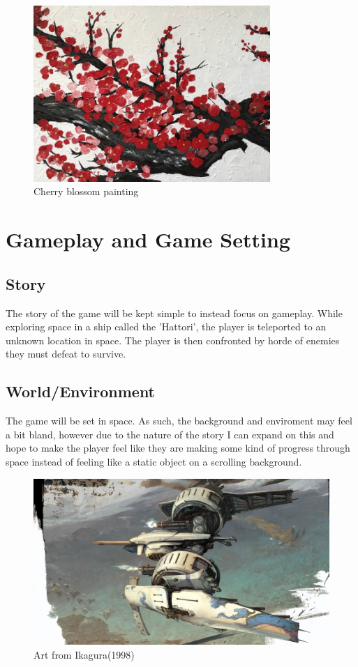 \documentclass[a4paper]{scrreprt}
\begin{document}
  \begin{figure}[h]
    \centering
    \includegraphics[width=0.8\textwidth]{cherry}
    \caption{Cherry blossom painting}
    \end{figure}
\chapter{Gameplay and Game Setting}
\section{Story}
The story of the game will be kept simple to instead focus on gameplay. While exploring space in a ship called the 'Hattori', the player is teleported to an unknown location in space. The player is then confronted by horde of enemies they must defeat to survive.

\section{World/Environment}
The game will be set in space. As such, the background and enviroment may feel a bit bland, however due to the nature of the story I can expand on this and hope to make the player feel like they are making some kind of progress through space instead of feeling like a static object on a scrolling background. 

\begin{figure}[h!]
  \centering
  \includegraphics[width=1\textwidth]{Ikagura}
  \caption{\label{fig:art}Art from Ikagura(1998)}
  \end{figure}
\end{document}
